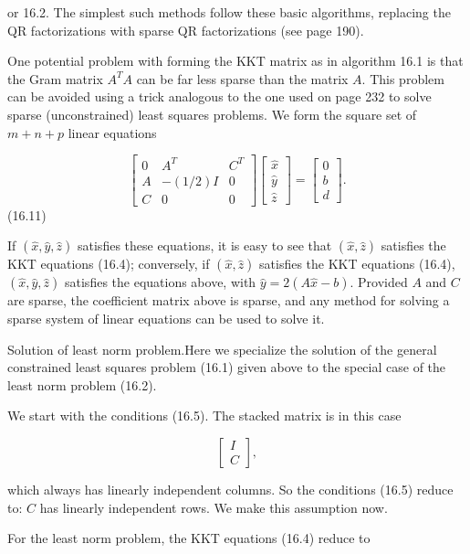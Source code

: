 or 16.2. The simplest such methods follow these basic algorithms, replacing the QR factorizations with sparse QR factorizations (see page 190).

One potential problem with forming the KKT matrix as in algorithm 16.1 is that the Gram matrix \(A^{T}A\) can be far less sparse than the matrix \(A\). This problem can be avoided using a trick analogous to the one used on page 232 to solve sparse (unconstrained) least squares problems. We form the square set of \(m+n+p\) linear equations

\[\left[\begin{array}{ccc}0&A^{T}&C^{T}\\ A&-(1/2)I&0\\ C&0&0\end{array}\right]\left[\begin{array}{c}\hat{x}\\ \hat{y}\\ \hat{z}\end{array}\right]=\left[\begin{array}{c}0\\ b\\ d\end{array}\right].\] (16.11)

If \((\hat{x},\hat{y},\hat{z})\) satisfies these equations, it is easy to see that \((\hat{x},\hat{z})\) satisfies the KKT equations (16.4); conversely, if \((\hat{x},\hat{z})\) satisfies the KKT equations (16.4), \((\hat{x},\hat{y},\hat{z})\) satisfies the equations above, with \(\hat{y}=2(A\hat{x}-b)\). Provided \(A\) and \(C\) are sparse, the coefficient matrix above is sparse, and any method for solving a sparse system of linear equations can be used to solve it.

Solution of least norm problem.Here we specialize the solution of the general constrained least squares problem (16.1) given above to the special case of the least norm problem (16.2).

We start with the conditions (16.5). The stacked matrix is in this case

\[\left[\begin{array}{c}I\\ C\end{array}\right],\]

which always has linearly independent columns. So the conditions (16.5) reduce to: \(C\) has linearly independent rows. We make this assumption now.

For the least norm problem, the KKT equations (16.4) reduce to

